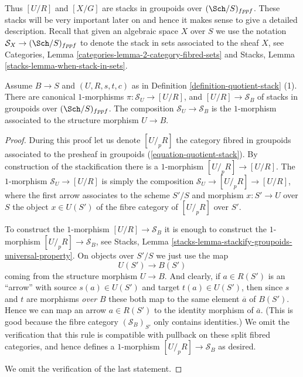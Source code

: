 \noindent
Thus $[U/R]$ and $[X/G]$ are stacks in groupoids over
$(\Sch/S)_{fppf}$. These stacks will be very important later
on and hence it makes sense to give a detailed description.
Recall that given an algebraic space $X$ over $S$ we use the
notation $\mathcal{S}_X \to (\Sch/S)_{fppf}$ to denote
the stack in sets associated to the sheaf $X$, see
Categories, Lemma \ref{categories-lemma-2-category-fibred-sets}
and
Stacks, Lemma \ref{stacks-lemma-when-stack-in-sets}.

\begin{lemma}
\label{lemma-quotient-stack-arrows}
Assume $B \to S$ and $(U, R, s, t, c)$ as in
Definition \ref{definition-quotient-stack} (1).
There are canonical $1$-morphisms
$\pi : \mathcal{S}_U \to [U/R]$, and $[U/R] \to \mathcal{S}_B$
of stacks in groupoids over $(\Sch/S)_{fppf}$.
The composition $\mathcal{S}_U \to \mathcal{S}_B$ is the $1$-morphism
associated to the structure morphism $U \to B$.
\end{lemma}

\begin{proof}
During this proof let us denote $[U/_{\!p}R]$ the category fibred in
groupoids associated to the presheaf in groupoids
(\ref{equation-quotient-stack}). By construction of the stackification
there is a $1$-morphism $[U/_{\!p}R] \to [U/R]$.
The $1$-morphism $\mathcal{S}_U \to [U/R]$ is simply the composition
$\mathcal{S}_U \to [U/_{\!p}R] \to [U/R]$, where the first arrow
associates to the scheme $S'/S$ and morphism $x : S' \to U$ over $S$
the object $x \in U(S')$ of the fibre category of $[U/_{\!p}R]$
over $S'$.

\medskip\noindent
To construct the $1$-morphism $[U/R] \to \mathcal{S}_B$ it is enough to
construct the $1$-morphism $[U/_{\!p}R] \to \mathcal{S}_B$, see
Stacks, Lemma \ref{stacks-lemma-stackify-groupoids-universal-property}.
On objects over $S'/S$ we just use the map
$$
U(S') \longrightarrow B(S')
$$
coming from the structure morphism $U \to B$.
And clearly, if $a \in R(S')$ is an ``arrow'' with source
$s(a) \in U(S')$ and target $t(a) \in U(S')$, then since
$s$ and $t$ are morphisms {\it over} $B$ these both
map to the same element $\overline{a}$ of $B(S')$. Hence we can map an arrow
$a \in R(S')$ to the identity morphism of $\overline{a}$. (This is
good because the fibre category $(\mathcal{S}_B)_{S'}$ only contains
identities.) We omit the verification that this rule is compatible with
pullback on these split fibred categories, and hence defines a
$1$-morphism $[U/_{\!p}R] \to \mathcal{S}_B$ as desired.

\medskip\noindent
We omit the verification of the last statement.
\end{proof}

